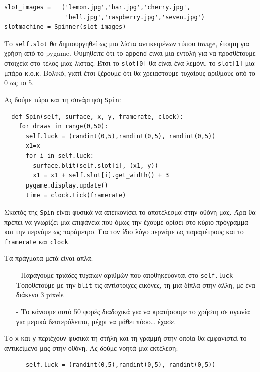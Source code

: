 \begin{verbatim}
slot_images =   ('lemon.jpg','bar.jpg','cherry.jpg',
                 'bell.jpg','raspberry.jpg','seven.jpg')
slotmachine = Spinner(slot_images)
\end{verbatim}

Το {\tt self.slot} θα δημιουργηθεί ως μια λίστα αντικειμένων τύπου image, έτοιμη για χρήση από το pygame. Θυμηθείτε ότι το {\tt append} είναι μια εντολή για να προσθέτουμε στοιχεία στο τέλος μιας λίστας. Έτσι το {\tt slot[0]} θα είναι ένα λεμόνι, το {\tt slot[1]} μια μπάρα κ.ο.κ. Βολικό, γιατί έτσι ξέρουμε ότι θα χρειαστούμε τυχαίους αριθμούς από το 0 ως το 5.

Ας δούμε τώρα και τη συνάρτηση {\tt Spin}:

\begin{verbatim}
  def Spin(self, surface, x, y, framerate, clock):
    for draws in range(0,50):
      self.luck = (randint(0,5),randint(0,5), randint(0,5))
      x1=x
      for i in self.luck:
        surface.blit(self.slot[i], (x1, y))
        x1 = x1 + self.slot[i].get_width() + 3
      pygame.display.update()
      time = clock.tick(framerate)
\end{verbatim}

Σκοπός της {\tt Spin} είναι φυσικά να απεικονίσει το αποτέλεσμα στην οθόνη
μας. Άρα θα πρέπει να γνωρίζει μια επιφάνεια που όμως την έχουμε ορίσει στο
κύριο πρόγραμμα και την περνάμε ως παράμετρο. Για τον ίδιο λόγο περνάμε ως
παραμέτρους και το {\tt framerate} και {\tt clock}.

Τα πράγματα μετά είναι απλά:
%
\begin{itemize}
\item[-] Παράγουμε τριάδες τυχαίων αριθμών που αποθηκεύονται στο {\tt self.luck}
Τοποθετούμε με την {\tt blit} τις αντίστοιχες εικόνες, τη μια δίπλα στην άλλη, με ένα διάκενο 3 pixels
\item[-] Το κάνουμε αυτό 50 φορές διαδοχικά για να κρατήσουμε το χρήστη σε αγωνία για μερικά δευτερόλεπτα, μέχρι να μάθει πόσο\ldots{} έχασε.
\end{itemize}
%
Το {\tt x} και {\tt y} περιέχουν φυσικά τη στήλη και τη γραμμή στην οποία θα εμφανιστεί το αντικείμενο μας στην οθόνη. Ας δούμε νοητά μια εκτέλεση:

\begin{verbatim}
      self.luck = (randint(0,5),randint(0,5), randint(0,5))
\end{verbatim}


